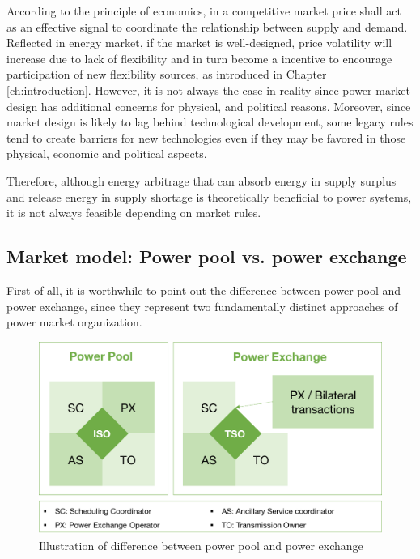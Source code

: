 According to the principle of economics, in a competitive market price shall act as an effective signal to coordinate the relationship between supply and demand. Reflected in energy market, if the market is well-designed, price volatility will increase due to lack of flexibility and in turn become a incentive to encourage participation of new flexibility sources, as introduced in Chapter \ref{ch:introduction}. However, it is not always the case in reality since power market design has additional concerns for physical, and political reasons. Moreover, since market design is likely to lag behind technological development, some legacy rules tend to create barriers for new technologies even if they may be favored in those physical, economic and political aspects.

Therefore, although energy arbitrage that can absorb energy in supply surplus and release energy in supply shortage is theoretically beneficial to power systems, it is not always feasible depending on market rules. 

\subsection{Market model: Power pool vs. power exchange}

First of all, it is worthwhile to point out the difference  between power pool and power exchange, since they represent two fundamentally distinct approaches of power market organization. 

\begin{figure}[h!]
	\centering
	\includegraphics[width=0.95\linewidth]{Figures/PowerPoolExchange}
	\caption{Illustration of difference between power pool and power exchange}
	\label{fig:pppx}
\end{figure}

